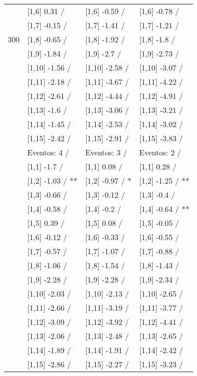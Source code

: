 \begin{table}
\begin{tabular}[t]{llll}
 & {}[1,6] 0.31  / & {}[1,6] -0.59  / & {}[1,6] -0.78  /\\
 & {}[1,7] -0.15  / & {}[1,7] -1.41  / & {}[1,7] -1.21  /\\
300 & {}[1,8] -0.65  / & {}[1,8] -1.92  / & {}[1,8] -1.8  /\\
\addlinespace
 & {}[1,9] -1.84  / & {}[1,9] -2.7  / & {}[1,9] -2.73  /\\
 & {}[1,10] -1.56  / & {}[1,10] -2.58  / & {}[1,10] -3.07  /\\
 & {}[1,11] -2.18  / & {}[1,11] -3.67  / & {}[1,11] -4.22  /\\
 & {}[1,12] -2.61  / & {}[1,12] -4.44  / & {}[1,12] -4.91  /\\
 & {}[1,13] -1.6  / & {}[1,13] -3.06  / & {}[1,13] -3.21  /\\
\addlinespace
 & {}[1,14] -1.45  / & {}[1,14] -2.53  / & {}[1,14] -3.02  /\\
 & {}[1,15] -2.42  / & {}[1,15] -2.91  / & {}[1,15] -3.83  /\\
 & Eventos:  4 / & Eventos:  3 / & Eventos:  2 /\\
 & {}[1,1] -1.7  / & {}[1,1] 0.08  / & {}[1,1] 0.28  /\\
 & {}[1,2] -1.03  / ** & {}[1,2] -0.97  / * & {}[1,2] -1.25  / **\\
\addlinespace
 & {}[1,3] -0.66  / & {}[1,3] -0.12  / & {}[1,3] -0.4  /\\
 & {}[1,4] -0.58  / & {}[1,4] -0.2  / & {}[1,4] -0.64  / **\\
 & {}[1,5] 0.39  / & {}[1,5] 0.08  / & {}[1,5] -0.05  /\\
 & {}[1,6] -0.12  / & {}[1,6] -0.33  / & {}[1,6] -0.55  /\\
 & {}[1,7] -0.57  / & {}[1,7] -1.07  / & {}[1,7] -0.88  /\\
\addlinespace
500 & {}[1,8] -1.06  / & {}[1,8] -1.54  / & {}[1,8] -1.43  /\\
 & {}[1,9] -2.28  / & {}[1,9] -2.28  / & {}[1,9] -2.34  /\\
 & {}[1,10] -2.03  / & {}[1,10] -2.13  / & {}[1,10] -2.65  /\\
 & {}[1,11] -2.66  / & {}[1,11] -3.19  / & {}[1,11] -3.77  /\\
 & {}[1,12] -3.09  / & {}[1,12] -3.92  / & {}[1,12] -4.41  /\\
\addlinespace
 & {}[1,13] -2.06  / & {}[1,13] -2.48  / & {}[1,13] -2.65  /\\
 & {}[1,14] -1.89  / & {}[1,14] -1.91  / & {}[1,14] -2.42  /\\
 & {}[1,15] -2.86  / & {}[1,15] -2.27  / & {}[1,15] -3.23  /\\
\bottomrule
\end{tabular}
\end{table}
